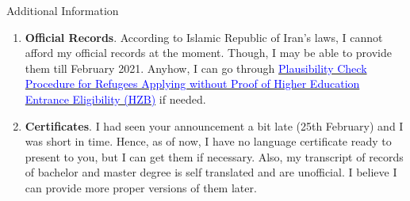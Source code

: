 \begin{cSection}{Additional Information}
	\begin{enumerate}[*]
		\item \textbf{Official Records}. According to Islamic Republic of Iran's laws, I cannot afford my official records at the moment. Though, I may be able to provide them till February 2021. Anyhow, I can go through \href{https://www.uni-hamburg.de/en/campuscenter/bewerbung/international/plausibilitaetspruefung.html}{\textcolor{blue}{Plausibility Check Procedure for Refugees Applying without Proof of Higher Education Entrance Eligibility (HZB)}} if needed.
		\item \textbf{Certificates}. I had seen your announcement a bit late (25th February) and I was short in time. Hence, as of now, I have no language certificate ready to present to you, but I can get them if necessary. Also, my transcript of records of bachelor and master degree is self translated and are unofficial. I believe I can provide more proper versions of them later.
	\end{enumerate}
\end{cSection}